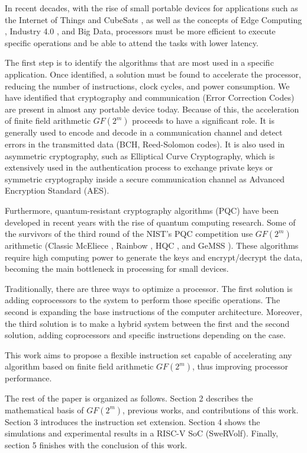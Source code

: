 In recent decades, with the rise of small portable devices for applications such as the Internet of Things \cite{5579543}
and CubeSats \cite{heidt2000cubesat}, as well as the concepts of Edge Computing \cite{7488250}, Industry 4.0 \cite{lasi2014industry}, 
and Big Data, processors must be more efficient to execute specific operations and be able to attend the tasks with lower latency.


The first step is to identify the algorithms that are most used in a specific application. 
Once identified, a solution must be found to accelerate the processor, reducing the number of instructions, 
clock cycles, and power consumption. We have identified that cryptography and communication 
(Error Correction Codes) are present in almost any portable device today. 
Because of this, the acceleration of finite field arithmetic $GF(2^m)$ proceeds to have a significant role. 
It is generally used to encode and decode in a communication channel and detect errors in the transmitted data 
(BCH, Reed-Solomon codes). It is also used in asymmetric cryptography, such as Elliptical Curve Cryptography, 
which is extensively used in the authentication process to exchange private keys or symmetric cryptography 
inside a secure communication channel as Advanced Encryption Standard (AES).


Furthermore, quantum-resistant cryptography algorithms (PQC) \cite{8791343} have been developed in recent years 
with the rise of quantum computing research. Some of the survivors of the third round of the NIST's PQC competition \cite{moody2016post} 
use $GF(2^m)$ arithmetic (Classic McEliece \cite{bernstein2017classic}, Rainbow \cite{10.1007/11496137_12}, HQC \cite{melchor2018hamming}, and GeMSS \cite{casanova2017gemss}). 
These algorithms require high computing power to generate the keys and encrypt/decrypt the data, 
becoming the main bottleneck in processing for small devices.


Traditionally, there are three ways to optimize a processor. The first solution is adding coprocessors 
to the system to perform those specific operations. The second is expanding the base instructions 
of the computer architecture. Moreover, the third solution is to make a hybrid system \cite{4352011} between the first and 
the second solution, adding coprocessors and specific instructions depending on the case. 


This work aims to propose a flexible instruction set 
capable of accelerating any algorithm based on finite field arithmetic $GF(2^m)$, thus improving processor performance.


The rest of the paper is organized as follows. Section 2 describes the mathematical basis of $GF(2^m)$, previous works, 
and contributions of this work. Section 3 introduces the instruction set extension. Section 4 shows the simulations and 
experimental results in a RISC-V SoC (SweRVolf). Finally, section 5 finishes with the conclusion of this work.


